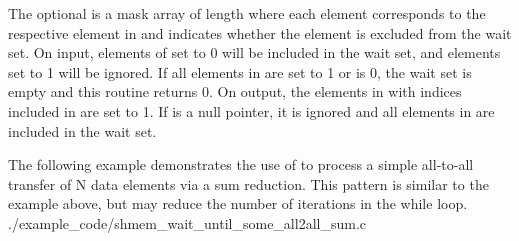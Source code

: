 \begin{apidefinition}
{    The optional  is a mask array of length  where each
    element corresponds to the respective element in  and indicates
    whether the element is excluded from the wait set.  On input, elements of
     set to 0 will be included in the wait set, and elements set to
    1 will be ignored.  If all elements in  are set to 1 or
     is 0, the wait set is empty and this routine returns 0. On
    output, the elements in  with indices included in 
    are set to 1.  If  is a null pointer, it is ignored
    and all elements in  are included in the wait set.
}






\begin{apiexamples}
  \apicexample
      {The following \Cstd[11] example demonstrates the use of
       to process a simple all-to-all transfer
      of N data elements via a sum reduction.  This pattern is similar to the
       example above, but may reduce the number of
      iterations in the while loop.}
      {./example_code/shmem_wait_until_some_all2all_sum.c}
      {}

\end{apiexamples}

\end{apidefinition}
